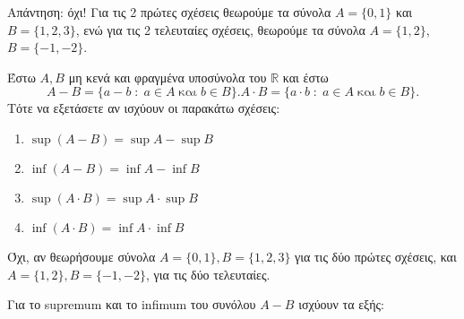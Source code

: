 \documentclass[main.tex]{subfiles}
\begin{document}
\begin{solution}
  Απάντηση: όχι! 
  Για τις 2 πρώτες σχέσεις θεωρούμε τα σύνολα $ A= \{ 0,1 \} $ και $ B= \{ 1,2,3 \} $, 
  ενώ για τις 2 τελευταίες σχέσεις, θεωρούμε τα σύνολα $ A = \{ 1,2 \} $, $ B = \{ -1,-2
  \}$.
\end{solution}

\begin{exercise}
  Έστω $ A,B $ μη κενά και φραγμένα υποσύνολα του $ \mathbb{R} $ και έστω 
  \[
    A-B= \{ a-b \; : \; a \in A \; \text{και} \; b \in B \} . 
    A\cdot B= \{ a\cdot b \; : \; a \in A \; \text{και} \; b \in B \} . 
  \]
  Τότε να εξετάσετε αν ισχύουν οι παρακάτω σχέσεις:
  \begin{enumerate}
    \item $ \sup {(A-B)}= \sup A - \sup B $
    \item $ \inf {(A-B)}= \inf A - \inf B $
    \item $ \sup {(A\cdot B)}= \sup A \cdot  \sup B $
    \item $ \inf {(A\cdot B)}= \inf A \cdot  \inf B $
  \end{enumerate}
\end{exercise}
\begin{solution}
  Όχι, αν θεωρήσουμε σύνολα $ A = \{ 0,1 \} , B = \{ 1,2,3 \} $ για τις 
  δύο πρώτες σχέσεις, και $ A = \{ 1,2 \} , B = \{ -1,-2 \} $, για τις δύο 
  τελευταίες.
\end{solution}

\begin{rem}
  Για το supremum και το infimum του συνόλου $ A-B $ ισχύουν τα εξής:

\end{rem}
\end{document}
